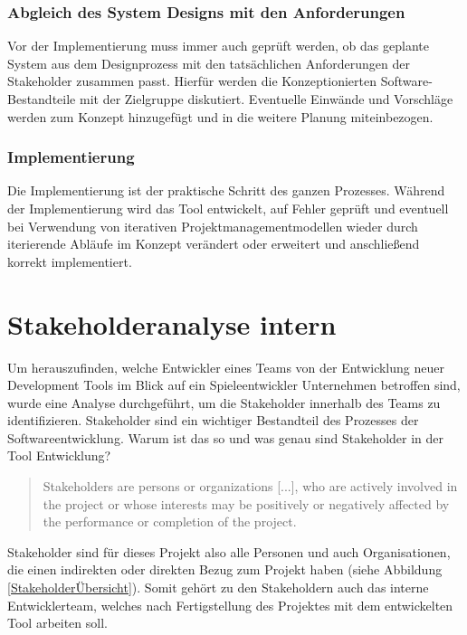 \documentclass[pagesize, paper=a4, fontsize=12pt, titlepage=true, headings=small, headnosepline, abstractoff, liststotoc, nochapterprefix, plainheadsepline, twoside]{scrreprt}
\begin{document}
\subsubsection{Abgleich des System Designs mit den Anforderungen}
Vor der Implementierung muss immer auch geprüft werden, ob das geplante System aus dem Designprozess mit den tatsächlichen Anforderungen der Stakeholder zusammen passt. Hierfür werden die Konzeptionierten Software-Bestandteile mit der Zielgruppe diskutiert. Eventuelle Einwände und Vorschläge werden zum Konzept hinzugefügt und in die weitere Planung miteinbezogen.

\subsubsection{Implementierung}
Die Implementierung ist der praktische Schritt des ganzen Prozesses. Während der Implementierung wird das Tool entwickelt, auf Fehler geprüft und eventuell bei Verwendung von iterativen Projektmanagementmodellen wieder durch iterierende Abläufe im Konzept verändert oder erweitert und anschließend korrekt implementiert.

\section{Stakeholderanalyse intern}
Um herauszufinden, welche Entwickler eines Teams von der Entwicklung neuer Development Tools im Blick auf ein Spieleentwickler Unternehmen betroffen sind, wurde eine Analyse durchgeführt, um die Stakeholder innerhalb des Teams zu identifizieren. Stakeholder sind ein wichtiger Bestandteil des Prozesses der Softwareentwicklung. Warum ist das so und was genau sind Stakeholder in der Tool Entwicklung?
\begin{quote}
\glqq Stakeholders are persons or organizations [...], who are actively involved in the project or whose interests may be positively or negatively affected
by the performance or completion of the project.\grqq{} 
\end{quote}
Stakeholder sind für dieses Projekt also alle Personen und auch Organisationen, die einen indirekten oder direkten Bezug zum Projekt haben (siehe Abbildung \ref{StakeholderÜbersicht}). Somit gehört zu den Stakeholdern auch das interne Entwicklerteam, welches nach Fertigstellung des Projektes mit dem entwickelten Tool arbeiten soll.
\end{document}
